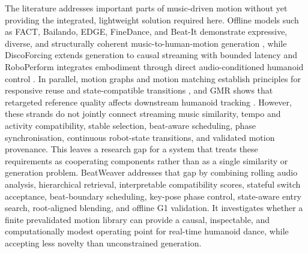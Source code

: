 The literature addresses important parts of music-driven motion without yet
providing the integrated, lightweight solution required here. Offline models
such as FACT, Bailando, EDGE, FineDance, and Beat-It demonstrate expressive,
diverse, and structurally coherent music-to-human-motion generation
\cite{li2021ai,siyao2022bailando,tseng2023edge,li2023finedance,huang2024beat},
while DiscoForcing extends generation to causal streaming with bounded latency
\cite{ji2026discoforcing} and RoboPerform integrates embodiment through direct
audio-conditioned humanoid control \cite{li2026you}. In parallel, motion graphs
and motion matching establish principles for responsive reuse and
state-compatible transitions \cite{kovar2023motion,holden2020learned}, and GMR
shows that retargeted reference quality affects downstream humanoid tracking
\cite{araujo2025retargeting}. However, these strands do not jointly connect
streaming music similarity, tempo and activity compatibility, stable selection,
beat-aware scheduling, phase synchronisation, continuous robot-state
transitions, and validated motion provenance. This leaves a research gap for a
system that treats these requirements as cooperating components rather than as
a single similarity or generation problem. BeatWeaver addresses that gap by
combining rolling audio analysis, hierarchical retrieval, interpretable
compatibility scores, stateful switch acceptance, beat-boundary scheduling,
key-pose phase control, state-aware entry search, root-aligned blending, and
offline G1 validation. It investigates whether a finite prevalidated motion library can
provide a causal, inspectable, and computationally modest operating point for
real-time humanoid dance, while accepting less novelty than unconstrained
generation.
